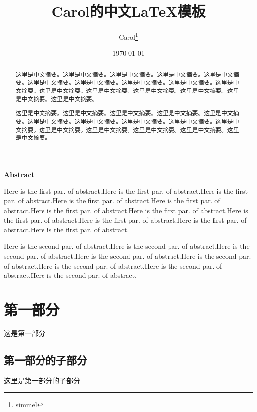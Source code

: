 \documentclass[UTF8,a4paper,12pt]{ctexart}
\title{\textbf{\Large{Carol的中文\LaTeX{}模板}}}
\author{ Carol\thanks{simmel} }
\date{\today}
\begin{document}
 
\maketitle
 
\begin{abstract}
这里是中文摘要。这里是中文摘要。这里是中文摘要。这里是中文摘要。这里是中文摘要。这里是中文摘要。这里是中文摘要。这里是中文摘要。这里是中文摘要。这里是中文摘要。这里是中文摘要。这里是中文摘要。这里是中文摘要。这里是中文摘要。这里是中文摘要。这里是中文摘要。
 
这里是中文摘要。这里是中文摘要。这里是中文摘要。这里是中文摘要。这里是中文摘要。这里是中文摘要。这里是中文摘要。这里是中文摘要。这里是中文摘要。这里是中文摘要。这里是中文摘要。这里是中文摘要。这里是中文摘要。这里是中文摘要。这里是中文摘要。
\end{abstract}
 
\begin{center}
\large{\textbf{Abstract}}
\end{center}
 
\begin{adjustwidth}{1cm}{1cm}
\hspace{1.5em}Here is the first par. of abstract.Here is the first par. of abstract.Here is the first par. of abstract.Here is the first par. of abstract.Here is the first par. of abstract.Here is the first par. of abstract.Here is the first par. of abstract.Here is the first par. of abstract.Here is the first par. of abstract.Here is the first par. of abstract.Here is the first par. of abstract.
 
\noindent\hspace{1.5em}Here is the second par. of abstract.Here is the second par. of abstract.Here is the second par. of abstract.Here is the second par. of abstract.Here is the second par. of abstract.Here is the second par. of abstract.Here is the second par. of abstract.Here is the second par. of abstract.
\end{adjustwidth}
 
\thispagestyle{empty}       %
\newpage                    %
\newpage
\setcounter{page}{1}        %
 
 
\section{第一部分}
这是第一部分
\subsection{第一部分的子部分}
这里是第一部分的子部分
 
\end{document}
